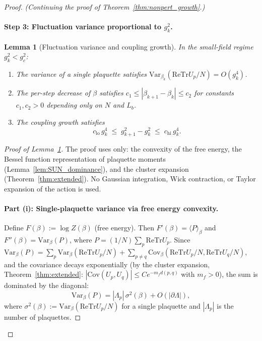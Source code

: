 \documentclass[11pt,a4paper]{amsart}
\newtheorem{lemma}[theorem]{Lemma}
\theoremstyle{definition}
\newcommand{\re}{\mathrm{Re}}
\newcommand{\Tr}{\mathrm{Tr}}
\newcommand{\gB}{g^2_c}
\begin{document}
\begin{proof}
\noindent\emph{(Continuing the proof of Theorem~\ref{thm:nonpert_growth}.)}

\paragraph{Step 3: Fluctuation variance proportional to $g^2_k$.}

\begin{lemma}[Fluctuation variance and coupling growth]
\label{lem:fluct_variance}
In the small-field regime $g^2_k < \gB$:
\begin{enumerate}[label=(\roman*)]
\item The variance of a single plaquette satisfies
  $\mathrm{Var}_{\beta_k}(\re\Tr U_p/N) = O(g^4_k)$.
\item The per-step decrease of $\beta$ satisfies
  $c_1 \le |\beta_{k+1} - \beta_k| \le c_2$ for constants $c_1, c_2 > 0$
  depending only on $N$ and $L_b$.
\item The coupling growth satisfies
\begin{equation}\label{eq:var_lower}
  c_{\mathrm{lo}}\,g^4_k \;\le\; g^2_{k+1} - g^2_k \;\le\; c_{\mathrm{hi}}\,g^4_k.
\end{equation}
\end{enumerate}
\end{lemma}

\begin{proof}[Proof of Lemma~\ref{lem:fluct_variance}]
The proof uses only: the convexity of the free energy, the Bessel function
representation of plaquette moments (Lemma~\ref{lem:SUN_dominance}), and the
cluster expansion (Theorem~\ref{thm:extended}).  No Gaussian integration,
Wick contraction, or Taylor expansion of the action is used.

\paragraph{Part (i): Single-plaquette variance via free energy convexity.}
Define $F(\beta) := \log Z(\beta)$ (free energy).
Then $F'(\beta) = \langle P\rangle_\beta$ and
$F''(\beta) = \mathrm{Var}_\beta(P)$, where $P = (1/N)\sum_p\re\Tr U_p$.
Since $\mathrm{Var}_\beta(P) = \sum_p \mathrm{Var}_\beta(\re\Tr U_p/N)
+ \sum_{p\ne q}\mathrm{Cov}_\beta(\re\Tr U_p/N, \re\Tr U_q/N)$,
and the covariance decays exponentially (by the cluster expansion,
Theorem~\ref{thm:extended}: $|\mathrm{Cov}(U_p,U_q)| \le C e^{-m_f d(p,q)}$
with $m_f > 0$), the sum is dominated by the diagonal:
\[
  \mathrm{Var}_\beta(P) = |\Lambda_p|\,\sigma^2(\beta) + O(|\partial\Lambda|),
\]
where $\sigma^2(\beta) := \mathrm{Var}_\beta(\re\Tr U_p/N)$ for a single
plaquette and $|\Lambda_p|$ is the number of plaquettes.


\end{proof}
\end{proof}
\end{document}
